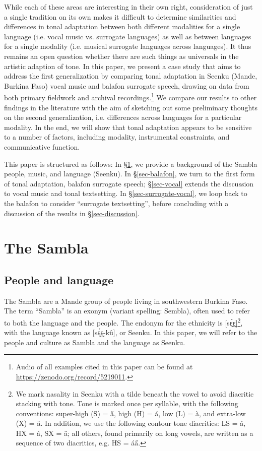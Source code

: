 \documentclass[output=paper]{langscibook}
\begin{document}
While each of these areas are interesting in their own right, consideration of just a single tradition on its own makes it difficult to determine similarities and differences in tonal adaptation between both different modalities for a single language (i.e. vocal music vs. surrogate languages) as well as between languages for a single modality (i.e. musical surrogate languages across languages). It thus remains an open question whether there are such things as universals in the artistic adaption of tone. In this paper, we present a case study that aims to address the first generalization by comparing tonal adaptation in Seenku (Mande, Burkina Faso) vocal music and balafon surrogate speech, drawing on data from both primary fieldwork and archival recordings.\footnote{Audio of all examples cited in this paper can be found at \url{https://zenodo.org/record/5219011}.} We compare our results to other findings in the literature with the aim of sketching out some preliminary thoughts on the second generalization, i.e. differences across languages for a particular modality. In the end, we will show that tonal adaptation appears to be sensitive to a number of factors, including modality, instrumental constraints, and communicative function. 

This paper is structured as follows: In \S\ref{sec-Sambla}, we provide a background of the Sambla people, music, and language (Seenku). In \S\ref{sec-balafon}, we turn to the first form of tonal adaptation, balafon surrogate speech; \S\ref{sec-vocal} extends the discussion to vocal music and tonal textsetting. In \S\ref{sec-surrogate-vocal}, we loop back to the balafon to consider ``surrogate textsetting'', before concluding with a discussion of the results in \S\ref{sec-discussion}. 


\section{The Sambla}\label{sec-Sambla}

\subsection{People and language}

The Sambla are a Mande group of people living in southwestern Burkina Faso. The term ``Sambla'' is an exonym (variant spelling: Sembla), often used to refer to both the language and the people. The endonym for the ethnicity is [sɛ̰́ɛ̰]\footnote{We mark nasality in Seenku with a tilde beneath the vowel to avoid diacritic stacking with tone. Tone is marked once per syllable, with the following conventions: super-high (S) = a̋, high (H) = á, low (L) = à, and extra-low (X) = ȁ. In addition, we use the following contour tone diacritics: LS = ǎ, HX = â, SX = ä; all others, found primarily on long vowels, are written as a sequence of two diacritics, e.g. HS = áa̋.}, with the language known as [sɛ̰́ɛ̰-kû], or Seenku. In this paper, we will refer to the people and culture as Sambla and the language as Seenku. 
\end{document}
